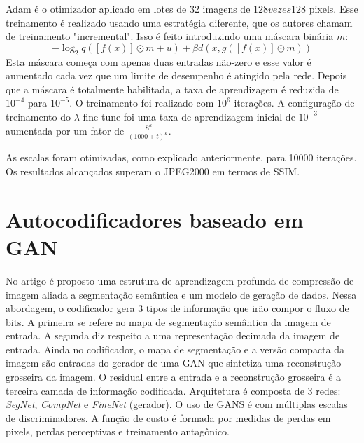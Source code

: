 Adam é o otimizador aplicado em lotes de 32 imagens de $128 vezes 128$ pixels. Esse treinamento é realizado usando uma estratégia diferente, que os autores chamam de treinamento "incremental". Isso é feito introduzindo uma máscara binária $m$:
\begin{equation}
-\log_2 q([f(x)] \odot m + u) + \beta d(x, g([f(x)] \odot m))
\end{equation}
Esta máscara começa com apenas duas entradas não-zero e esse valor é aumentado cada vez que um limite de desempenho é atingido pela rede. Depois que a máscara é totalmente habilitada, a taxa de aprendizagem é reduzida de $10^{-4}$ para $10^{-5}$. O treinamento foi realizado com  $10^6$ iterações. A configuração de treinamento do $\lambda$ fine-tune foi uma taxa de aprendizagem inicial de $10^{-3}$ aumentada por um fator de $\frac{.8^\kappa}{{(1000 + t)}^\kappa}$.  

As escalas foram otimizadas, como explicado anteriormente, para 10000 iterações. Os resultados alcançados superam o JPEG2000 em termos de SSIM.



\section{Autocodificadores baseado em GAN}


No artigo \cite{akbari2019dsslic} é proposto uma estrutura de aprendizagem profunda de compressão de imagem aliada a segmentação semântica e um modelo de geração de dados. 
Nessa abordagem, o codificador gera 3 tipos de informação que irão compor o fluxo de bits. A primeira se refere ao mapa de segmentação semântica da imagem de entrada. A segunda diz respeito a uma representação decimada da imagem de entrada. Ainda no codificador, o mapa de segmentação e a versão compacta da imagem são entradas do gerador de uma GAN que sintetiza uma reconstrução grosseira da imagem. O residual entre a entrada e a reconstrução grosseira é a terceira camada de informação codificada. Arquitetura é composta de 3 redes: \textit{SegNet}, \textit{CompNet} e \textit{FineNet} (gerador). O uso de GANS é com múltiplas escalas de discriminadores. 
A função de custo é formada por medidas de perdas em pixels, perdas perceptivas e treinamento antagônico.

